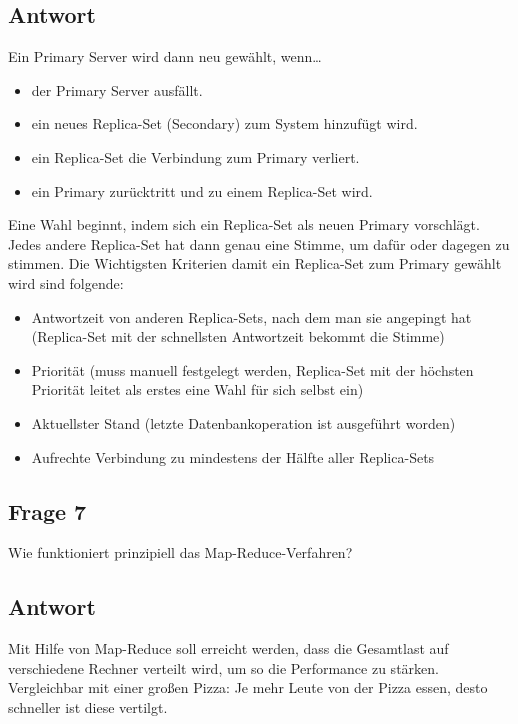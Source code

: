 \subsection*{Antwort}
Ein Primary Server wird dann neu gewählt,  wenn…
\begin{itemize}
	\item der Primary Server ausfällt.
	\item ein neues Replica-Set (Secondary) zum System hinzufügt wird.
	\item ein Replica-Set die Verbindung zum Primary verliert.
	\item ein Primary zurücktritt und zu einem Replica-Set wird.
\end{itemize}
Eine Wahl beginnt, indem sich ein Replica-Set als neuen Primary vorschlägt. Jedes andere Replica-Set hat dann genau eine Stimme, um dafür oder dagegen zu stimmen.
Die Wichtigsten Kriterien damit ein Replica-Set zum Primary gewählt wird sind folgende:
\begin{itemize}
	\item Antwortzeit von anderen Replica-Sets, nach dem man sie angepingt hat (Replica-Set mit der schnellsten Antwortzeit bekommt die Stimme)
	\item Priorität (muss manuell festgelegt werden, Replica-Set mit der höchsten Priorität leitet als erstes eine Wahl für sich selbst ein)
	\item Aktuellster Stand (letzte Datenbankoperation ist ausgeführt worden)
	\item Aufrechte Verbindung zu mindestens der Hälfte aller Replica-Sets
\end{itemize}

\subsection*{Frage 7}
Wie funktioniert prinzipiell das Map-Reduce-Verfahren?
\subsection*{Antwort}
Mit Hilfe von Map-Reduce soll erreicht werden, dass die Gesamtlast auf verschiedene Rechner verteilt wird, um so die Performance zu stärken. Vergleichbar mit einer großen Pizza: Je mehr Leute von der Pizza essen, desto schneller ist diese vertilgt. 

